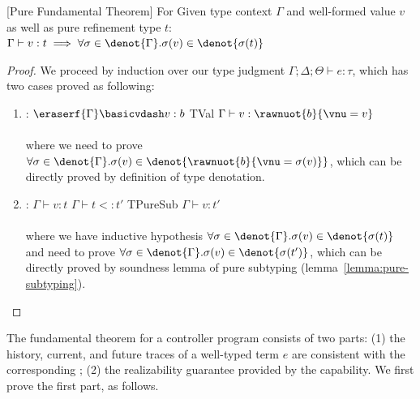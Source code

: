 \begin{theorem}\label{theorem:pure-fundamental-ap}[Pure Fundamental Theorem] For Given type context $\Gamma$ and well-formed value $v$ as well as pure refinement type $t$:
  $\Gamma \vdash v: t \implies \forall \sigma \in \denot{\Gamma}. \sigma(v) \in \denot{\sigma(t)}$
\end{theorem}
\begin{proof} We proceed by induction over our type judgment $\Gamma;\Delta;\Theta \vdash e : \tau$, which has two cases proved as following:
\begin{enumerate}[label=Case]
\item:
{\footnotesize
\mprooftr{23mm}
{$\eraserf{\Gamma} \basicvdash v : b$}
{TVal}
{$\Gamma \vdash v : \rawnuot{b}{\vnu = v}$}
\ \\ \ \\}
where we need to prove $\forall \sigma \in \denot{\Gamma}. \sigma(v) \in\denot{\rawnuot{b}{\vnu = \sigma(v)}}$, which can be directly proved by definition of type denotation.
\item:
{\footnotesize
\mprooftr{38mm}
{$\Gamma \vdash v : t$ \quad
$\Gamma \vdash t <: t'$}
{TPureSub}
{$\Gamma \vdash v : t'$}
\ \\ \ \\}
where we have inductive hypothesis $\forall \sigma \in \denot{\Gamma}. \sigma(v) \in\denot{\sigma(t)}$ and need to prove $\forall \sigma \in \denot{\Gamma}. \sigma(v) \in\denot{\sigma(t')}$, which can be directly proved by soundness lemma of pure subtyping (lemma~\ref{lemma:pure-subtyping}).
\end{enumerate}
\end{proof}


The fundamental theorem for a controller program consists of two parts: (1) the history, current, and future traces of a well-typed term \( e \) are consistent with the corresponding \PAT; (2) the realizability guarantee provided by the capability. We first prove the first part, as follows.

